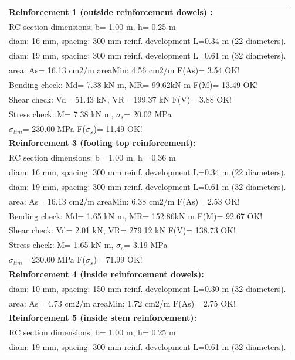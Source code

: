 \begin{center}
\begin{supertabular}[H]{|l|}
\hline
\textbf{Reinforcement 1 (outside reinforcement dowels) :} \\
  RC section dimensions; b= 1.00 m, h= 0.25 m\\
  diam: 16 mm, spacing: 300 mm  reinf. development L=0.34 m (22 diameters).\\
  diam: 19 mm, spacing: 300 mm  reinf. development L=0.61 m (32 diameters).\\
  area: As=  16.13 cm2/m areaMin:   4.56 cm2/m  F(As)= 3.54 OK!\\
  Bending check: Md=   7.38 kN m, MR=  99.62kN m  F(M)= 13.49 OK!\\
  Shear check: Vd=  51.43 kN,  VR= 199.37 kN  F(V)= 3.88 OK!\\
  Stress check: M=   7.38 kN m, $\sigma_s$=  20.02 MPa\\
    $\sigma_{lim}$= 230.00 MPa  F($\sigma_s$)= 11.49 OK!\\
\textbf{Reinforcement 3 (footing top reinforcement):}\\
  RC section dimensions; b= 1.00 m, h= 0.36 m\\
  diam: 16 mm, spacing: 300 mm  reinf. development L=0.34 m (22 diameters).\\
  diam: 19 mm, spacing: 300 mm  reinf. development L=0.61 m (32 diameters).\\
  area: As=  16.13 cm2/m areaMin:   6.38 cm2/m  F(As)= 2.53 OK!\\
  Bending check: Md=   1.65 kN m, MR= 152.86kN m  F(M)= 92.67 OK!\\
  Shear check: Vd=   2.01 kN,  VR= 279.12 kN  F(V)= 138.73 OK!\\
  Stress check: M=   1.65 kN m, $\sigma_s$=   3.19 MPa\\
    $\sigma_{lim}$= 230.00 MPa  F($\sigma_s$)= 71.99 OK!\\
\textbf{Reinforcement 4 (inside reinforcement dowels):}\\
  diam: 10 mm, spacing: 150 mm  reinf. development L=0.30 m (32 diameters).\\
  area: As=   4.73 cm2/m areaMin:   1.72 cm2/m  F(As)= 2.75 OK!\\
\textbf{Reinforcement 5 (inside stem reinforcement):}\\
  RC section dimensions; b= 1.00 m, h= 0.25 m\\
  diam: 19 mm, spacing: 300 mm  reinf. development L=0.61 m (32 diameters).\\

\end{supertabular}
\end{center}
